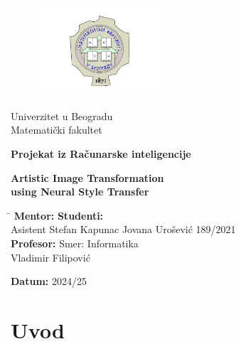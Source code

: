 \documentclass[a4paper,12pt]{article}
\begin{document}
\begin{titlepage}
    \centering
	\begin{figure}[htbp]
    	\centering
    	\includegraphics[width=0.4\textwidth]{logo.png}
	\end{figure}
    { Univerzitet u Beogradu \\ Matematički fakultet\par}
	
    \vfill

    {\Large \textbf{Projekat iz Računarske inteligencije}\par}

    \vspace{1cm}

    \begin{center}
    {\Large \textbf{Artistic Image Transformation}}\\
    {\Large \textbf{using Neural Style Transfer}}
    \end{center}

    \vfill

    
	
	
	\begin{tabbing}
        \hspace{10cm} \= \hspace{10cm} \kill
        \textbf{Mentor:} \>  \textbf{Studenti:} \\
        Asistent Stefan Kapunac \> Jovana Urošević 189/2021 \\
        \textbf{Profesor: } \> Smer: Informatika \\
        Vladimir Filipović \>
    \end{tabbing}
    
    \vfill

    \textbf{Datum:} 2024/25

\end{titlepage}
\newpage
\tableofcontents
\newpage
\section*{Uvod}
\end{document}
